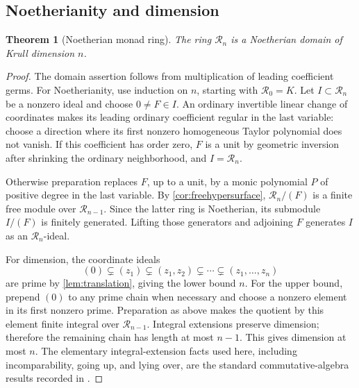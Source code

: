 \documentclass[11pt]{article}
\newtheorem{theorem}{Theorem}[section]
\theoremstyle{definition}
\newcommand{\RR}{\mathscr R}
\begin{document}
\subsection{Noetherianity and dimension}
\begin{theorem}[Noetherian monad ring]\label{thm:noetherian}
The ring $\RR_n$ is a Noetherian domain of Krull dimension $n$.
\end{theorem}
\begin{proof}
The domain assertion follows from multiplication of leading coefficient germs. For Noetherianity, use induction on $n$, starting with $\RR_0=K$. Let $I\subset\RR_n$ be a nonzero ideal and choose $0\ne F\in I$. An ordinary invertible linear change of coordinates makes its leading ordinary coefficient regular in the last variable: choose a direction where its first nonzero homogeneous Taylor polynomial does not vanish. If this coefficient has order zero, $F$ is a unit by geometric inversion after shrinking the ordinary neighborhood, and $I=\RR_n$.

Otherwise preparation replaces $F$, up to a unit, by a monic polynomial $P$ of positive degree in the last variable. By \cref{cor:freehypersurface}, $\RR_n/(F)$ is a finite free module over $\RR_{n-1}$. Since the latter ring is Noetherian, its submodule $I/(F)$ is finitely generated. Lifting those generators and adjoining $F$ generates $I$ as an $\RR_n$-ideal.

For dimension, the coordinate ideals
\[
 (0)\subsetneq(z_1)\subsetneq(z_1,z_2)\subsetneq\cdots
 \subsetneq(z_1,\ldots,z_n)
\]
are prime by \cref{lem:translation}, giving the lower bound $n$. For the upper bound, prepend $(0)$ to any prime chain when necessary and choose a nonzero element in its first nonzero prime. Preparation as above makes the quotient by this element finite integral over $\RR_{n-1}$. Integral extensions preserve dimension; therefore the remaining chain has length at most $n-1$. This gives dimension at most $n$. The elementary integral-extension facts used here, including incomparability, going up, and lying over, are the standard commutative-algebra results recorded in \cite{Stacks}.
\end{proof}
\end{document}
